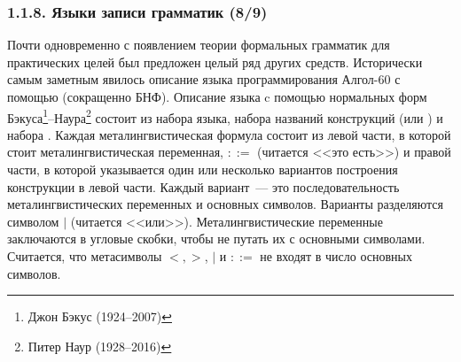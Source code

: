 \begin{frame}
\frametitle{1.1.8. Языки записи грамматик (8/9)}
Почти одновременно с появлением теории формальных
грамматик для
практических целей был предложен целый ряд других средств.
Исторически самым заметным явилось описание языка программирования
Алгол-60 с помощью 
 (сокращенно БНФ).
Описание языка c помощью нормальных форм 
Бэкуса\footnote{Джон Бэкус (1924--2007)}--Наура\footnote{Питер Наур (1928--2016)} 
состоит из набора 
 языка, 
набора названий конструкций (или
) и набора
.
Каждая металингвистическая формула состоит
из левой части, в которой
стоит металингвистическая переменная,  $::=$ (читается <<это есть>>)
и правой части, в которой указывается один или несколько вариантов
построения конструкции в левой части. Каждый вариант~--- это
последовательность металингвистических переменных и основных
символов. Варианты разделяются символом $|$ (читается <<или>>).
Металингвистические переменные заключаются в угловые скобки, чтобы
не путать их с основными символами. Считается, что метасимволы $<,
>$, $|$ и $::=$ не входят в число основных символов.

\end{frame}


